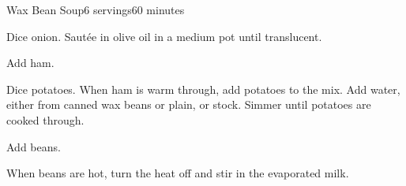 \documentclass[../Cookbook.tex]{subfiles}
\begin{document}
\begin{recipe}{Wax Bean Soup}{6 servings}{60 minutes}

Dice onion. Saut\'ee in olive oil in a medium pot until translucent.

Add ham.

Dice potatoes. When ham is warm through, add potatoes to the mix. Add water, either from canned wax beans or plain, or stock. Simmer until potatoes are cooked through.

Add beans.

When beans are hot, turn the heat off and stir in the evaporated milk.

\end{recipe}
\end{document}
